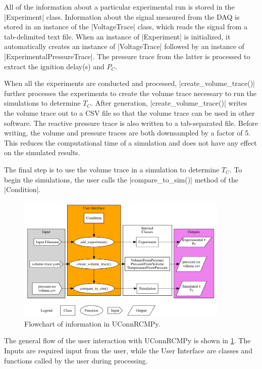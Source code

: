 \documentclass[12pt]{../ussci}
\begin{document}
All of the information about a particular experimental run is stored in
the \python|Experiment| class. Information about the signal
measured from the DAQ is stored in an instance of the
\python|VoltageTrace| class, which reads the signal from a
tab-delimited text file. When an instance of \python|Experiment|
is initialized, it automatically creates an instance of
\python|VoltageTrace| followed by an instance of
\python|ExperimentalPressureTrace|. The pressure trace from the
latter is processed to extract the ignition delay(s) and \(P_C\).

When all the experiments are conducted and processed,
\python|create_volume_trace()| further processes the experiments to
create the volume trace necessary to run the simulations to determine
\(T_C\). After generation, \python|create_volume_trace()| writes
the volume trace out to a CSV file so that the volume trace can be used in
other software. The reactive pressure trace is also written to a tab-separated
file. Before writing, the volume and pressure traces are both
downsampled by a factor of 5. This reduces the computational time of a
simulation and does not have any effect on the simulated results.

The final step is to use the volume trace in a simulation to determine
\(T_C\). To begin the simulations, the user calls the
\python|compare_to_sim()| method of the
\python|Condition|.

\begin{figure}[htbp]
\centering
\includegraphics[width=0.9\textwidth]{figures/flowchart.png}
\caption{Flowchart of information in UConnRCMPy.}
\label{fig:flowchart}
\end{figure}

The general flow of the user interaction with UConnRCMPy is shown in
\cref{fig:flowchart}. The Inputs are required input from the
user, while the User Interface are classes and functions called by the
user during processing.
\end{document}
